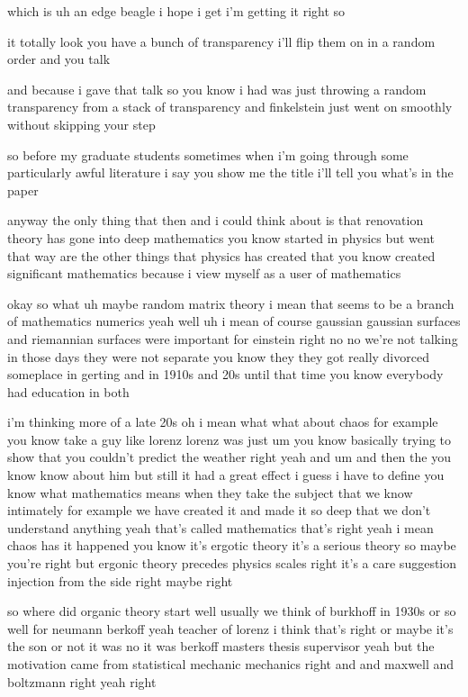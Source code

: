 \begin{description}
which is uh an edge beagle i hope i get i'm getting it right so

it totally look you have a bunch of transparency i'll flip them on in a random order and you talk

and because i gave that talk so you know i had was just throwing a random transparency from a stack of transparency and finkelstein just went on smoothly without skipping your step

so before my graduate students sometimes when i'm going through some particularly awful literature i say you show me the title i'll tell you what's in the paper

anyway the only thing that then and i could think about is that renovation theory has gone into deep mathematics you know started in physics but went that way are the other things that physics has created that you know created significant mathematics because i view myself as a user of mathematics

okay so what uh maybe random matrix theory i mean that seems to be a branch of mathematics numerics yeah well uh i mean of course gaussian gaussian surfaces and riemannian surfaces were important for einstein right no no we're not talking in those days they were not separate you know they they got really divorced someplace in gerting and in 1910s and 20s until that time you know everybody had education in both

i'm thinking more of a late 20s oh i mean what what about chaos for example you know take a guy like lorenz lorenz was just um you know basically trying to show that you couldn't predict the weather right yeah and um and then the you know know about him but still it had a great effect i guess i have to define you know what mathematics means when they take the subject that we know intimately for example we have created it and made it so deep that we don't understand anything yeah that's called mathematics that's right yeah i mean chaos has it happened you know it's ergotic theory it's a serious theory so maybe you're right but ergonic theory precedes physics scales right it's a care suggestion injection from the side right maybe right

so where did organic theory start well usually we think of burkhoff in 1930s or so well for neumann berkoff yeah teacher of lorenz i think that's right or maybe it's the son or not it was no it was berkoff masters thesis supervisor yeah but the motivation came from statistical mechanic mechanics right and and maxwell and boltzmann right yeah right


\end{description}
